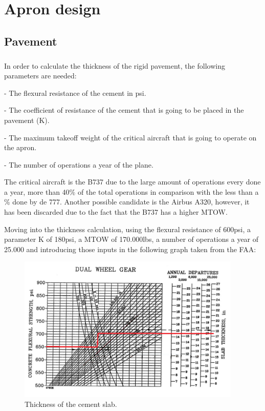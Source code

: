 \chapter{Apron design}
	\section{Pavement}
	\paragraph{}In order to calculate the thickness of the rigid pavement, the following parameters are needed:
		
	- The flexural resistance of the cement in psi. 
		
	- The coefficient of resistance of the cement that is going to be placed in the pavement (K).
		
	- The maximum takeoff weight of the critical aircraft that is going to operate on the apron.
		
	- The number of operations a year of the plane.
		
	The critical aircraft is the B737 due to the large amount of operations every done a year, more than 40\% of the total operations in comparison with the less than a \% done by de 777. Another possible candidate is the Airbus A320, however, it has been discarded due to the fact that the B737 has a higher MTOW.
		
	Moving into the thickness calculation, using the flexural resistance of 600psi, a parameter K of 180psi, a MTOW of 170.000lbs, a number of operations a year of 25.000 and introducing those inputs in the following graph taken from the FAA: 
		
	\begin{figure}[H]
		\centering
		\includegraphics[clip, trim=0cm 0cm 0cm 0cm, width=0.95\textwidth]{./images/pavement/apron/thickness1}
		\caption{Thickness of the cement slab.}
		\label{} %
	\end{figure}
	
